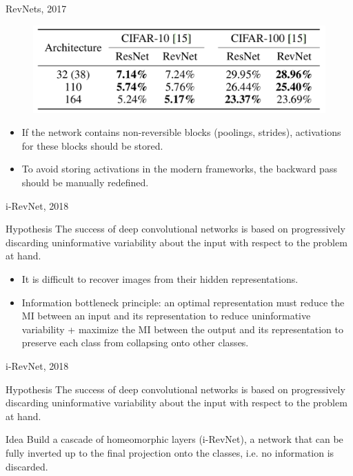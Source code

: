 \begin{frame}{RevNets, 2017}
	\begin{figure}
		\centering
		\includegraphics[width=0.8\linewidth]{figs/revnet_results.png}
	\end{figure}
	\begin{itemize}
		\item If the network contains non-reversible blocks (poolings, strides), activations for these blocks should be stored.
		\item To avoid storing activations in the modern frameworks, the backward pass should be manually redefined.
	\end{itemize}
\end{frame}
\begin{frame}{i-RevNet, 2018}
	\begin{block}{Hypothesis}
		The success of deep convolutional networks is based on progressively discarding uninformative variability about the input with respect to the problem at hand. 
	\end{block}
	\begin{itemize}
		\item It is difficult to recover images from their hidden representations. 
		\item Information bottleneck principle: an optimal representation must reduce the MI between an input and its representation to reduce uninformative variability + maximize the MI between the output and its representation to preserve each class from collapsing onto other classes.
	\end{itemize}
\end{frame}
\begin{frame}{i-RevNet, 2018}
	\begin{block}{Hypothesis}
		The success of deep convolutional networks is based on progressively discarding uninformative variability about the input with respect to the problem at hand. 
	\end{block}
	
	\begin{block}{Idea}
		Build a cascade of homeomorphic layers (i-RevNet), a network that can be fully inverted up to the final projection onto the classes, i.e. no information is discarded.
	\end{block}
\end{frame}
